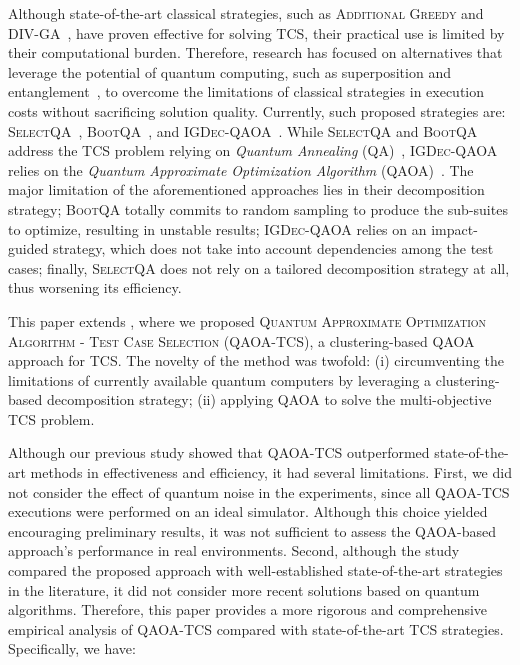 Although state-of-the-art classical strategies, such as \textsc{Additional Greedy} \citep{yoo2007pareto} and \textsc{DIV-GA}~\citep{panichella2014improving}, have proven effective for solving TCS, their practical use is limited by their computational burden. Therefore, research has focused on alternatives that leverage the potential of quantum computing, such as superposition and entanglement~\citep{hoare2005grand,knight2018serious}, to overcome the limitations of classical strategies in execution costs without sacrificing solution quality. Currently, such proposed strategies are: \textsc{SelectQA}~\citep{selectqa}, \textsc{BootQA}~\citep{bootqa}, and \textsc{IGDec-QAOA}~\citep{igdec_qaoa}. While \textsc{SelectQA} and \textsc{BootQA} address the TCS problem relying on \textit{Quantum Annealing} (QA)~\citep{kadowaki1998quantum,suzuki2009comparison}, \textsc{IGDec-QAOA} relies on the \textit{Quantum Approximate Optimization Algorithm} (QAOA)~\citep{farhi2014qaoa,qaoa2}. The major limitation of the aforementioned approaches lies in their decomposition strategy; \textsc{BootQA} totally commits to random sampling to produce the sub-suites to optimize, resulting in unstable results; \textsc{IGDec-QAOA} relies on an impact-guided strategy, which does not take into account dependencies among the test cases; finally, \textsc{SelectQA} does not rely on a tailored decomposition strategy at all, thus worsening its efficiency.

This paper extends \citet{qaoa_tcs}, where we proposed \textsc{Quantum Approximate Optimization Algorithm - Test Case Selection (QAOA-TCS)}, a clustering-based QAOA approach for TCS. The novelty of the method was twofold: (i) circumventing the limitations of currently available quantum computers by leveraging a clustering-based decomposition strategy; (ii) applying QAOA to solve the multi-objective TCS problem.

Although our previous study showed that \textsc{QAOA-TCS} outperformed state-of-the-art methods in effectiveness and efficiency, it had several limitations. First, we did not consider the effect of quantum noise in the experiments, since all \textsc{QAOA-TCS} executions were performed on an ideal simulator. Although this choice yielded encouraging preliminary results, it was not sufficient to assess the QAOA-based approach's performance in real environments. Second, although the study compared the proposed approach with well-established state-of-the-art strategies in the literature, it did not consider more recent solutions based on quantum algorithms. 
Therefore, this paper provides a more rigorous and comprehensive empirical analysis of \textsc{QAOA-TCS} compared with state-of-the-art TCS strategies.
Specifically, we have:

